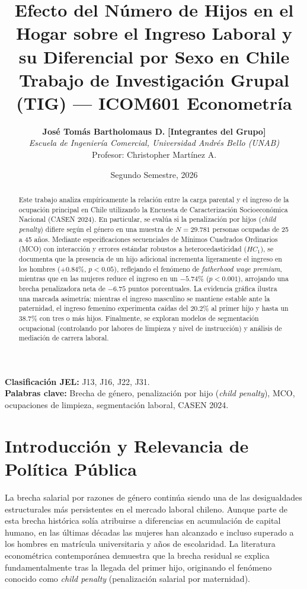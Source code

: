 \documentclass[11pt,a4paper]{article}
\title{\vspace{-1cm}\textbf{Efecto del Número de Hijos en el Hogar sobre el Ingreso Laboral y su Diferencial por Sexo en Chile}\\
\large Trabajo de Investigación Grupal (TIG) --- ICOM601 Econometría}
\author{
  \textbf{José Tomás Bartholomaus D.} \quad \textbf{[Integrantes del Grupo]}\\[0.4em]
  \textit{Escuela de Ingeniería Comercial, Universidad Andrés Bello (UNAB)}\\
  \small Profesor: Christopher Martínez A.
}
\date{Segundo Semestre, 2026}
\begin{document}
\maketitle

\begin{abstract}
Este trabajo analiza empíricamente la relación entre la carga parental y el ingreso de la ocupación principal en Chile utilizando la Encuesta de Caracterización Socioeconómica Nacional (CASEN 2024). En particular, se evalúa si la penalización por hijos (\textit{child penalty}) difiere según el género en una muestra de $N = 29.781$ personas ocupadas de 25 a 45 años. Mediante especificaciones secuenciales de Mínimos Cuadrados Ordinarios (MCO) con interacción y errores estándar robustos a heterocedasticidad ($HC_1$), se documenta que la presencia de un hijo adicional incrementa ligeramente el ingreso en los hombres ($+0.84\%$, $p < 0.05$), reflejando el fenómeno de \textit{fatherhood wage premium}, mientras que en las mujeres reduce el ingreso en un $-5.74\%$ ($p < 0.001$), arrojando una brecha penalizadora neta de $-6.75$ puntos porcentuales. La evidencia gráfica ilustra una marcada asimetría: mientras el ingreso masculino se mantiene estable ante la paternidad, el ingreso femenino experimenta caídas del $20.2\%$ al primer hijo y hasta un $38.7\%$ con tres o más hijos. Finalmente, se exploran modelos de segmentación ocupacional (controlando por labores de limpieza y nivel de instrucción) y análisis de mediación de carrera laboral.
\end{abstract}

\vspace{0.3cm}
\noindent \textbf{Clasificación JEL:} J13, J16, J22, J31. \\
\textbf{Palabras clave:} Brecha de género, penalización por hijo (\textit{child penalty}), MCO, ocupaciones de limpieza, segmentación laboral, CASEN 2024.

\vspace{0.5cm}

\section{Introducción y Relevancia de Política Pública}
La brecha salarial por razones de género continúa siendo una de las desigualdades estructurales más persistentes en el mercado laboral chileno. Aunque parte de esta brecha histórica solía atribuirse a diferencias en acumulación de capital humano, en las últimas décadas las mujeres han alcanzado e incluso superado a los hombres en matrícula universitaria y años de escolaridad. La literatura econométrica contemporánea \cite{kleven2019, kleven2025} demuestra que la brecha residual se explica fundamentalmente tras la llegada del primer hijo, originando el fenómeno conocido como \textit{child penalty} (penalización salarial por maternidad).
\end{document}
